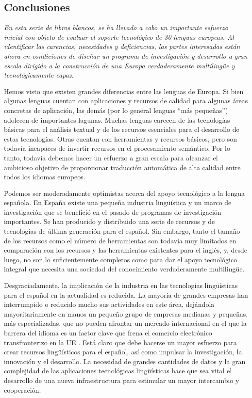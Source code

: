 \begin{multicols}{2}
\subsection{Conclusiones}

\emph{En esta serie de libros blancos, se ha llevado a cabo un importante esfuerzo inicial con objeto de evaluar el soporte tecnológico de 30 lenguas europeas. Al identificar las carencias, necesidades y deficiencias, las partes interesadas están ahora en condiciones de diseñar un programa de investigación y desarrollo a gran escala dirigido a la construcción de una Europa verdaderamente multilingüe y tecnológicamente capaz.}

Hemos visto que existen grandes diferencias entre las lenguas de Europa. Si bien algunas lenguas cuentan con aplicaciones y recursos de calidad para algunas áreas concretas de aplicación, las demás (por lo general lenguas ``más pequeñas'') adolecen de importantes lagunas. Muchas lenguas carecen de las tecnologías básicas para el análisis textual y de los recursos esenciales para el desarrollo de estas tecnologías. Otras cuentan con herramientas y recursos básicos, pero son todavía incapaces de invertir recursos en el procesamiento semántico. Por lo tanto, todavía debemos hacer un esfuerzo a gran escala para alcanzar el ambicioso objetivo de proporcionar traducción automática de alta calidad entre todos los idiomas europeos.

Podemos ser moderadamente optimistas acerca del apoyo tecnológico a la lengua española. En España existe una pequeña industria lingüística y un marco de investigación que se benefició en el pasado de programas de investigación importantes. Se han producido y distribuido una serie de recursos y de tecnologías de última generación para el español. Sin embargo, tanto el tamaño de los recursos como el número de herramientas son todavía muy limitados en comparación con los recursos y las herramientas existentes para el inglés, y, desde luego, no son lo suficientemente completos como para dar el apoyo tecnológico integral que necesita una sociedad del conocimiento verdaderamente multilingüe.

Desgraciadamente, la implicación de la industria en las tecnologías lingüísticas para el español en la actualidad es reducida. La mayoría de grandes empresas han interrumpido o reducido mucho sus actividades en este área, dejándola mayoritariamente en manos un pequeño grupo de empresas medianas y pequeñas, más especializadas, que no pueden afrontar un mercado internacional en el que la barrera del idioma es un factor clave que frena el comercio electrónico transfronterizo en la UE \cite{EUecommerce}.
%
Está claro que debe hacerse un mayor esfuerzo para crear recursos lingüísticos para el español, así como impulsar la investigación, la innovación y el desarrollo. La necesidad de grandes cantidades de datos y la gran complejidad de las aplicaciones tecnológicas lingüísticas hace que sea vital el desarrollo de una nueva infraestructura para estimular un mayor intercambio y cooperación.


\end{multicols}
